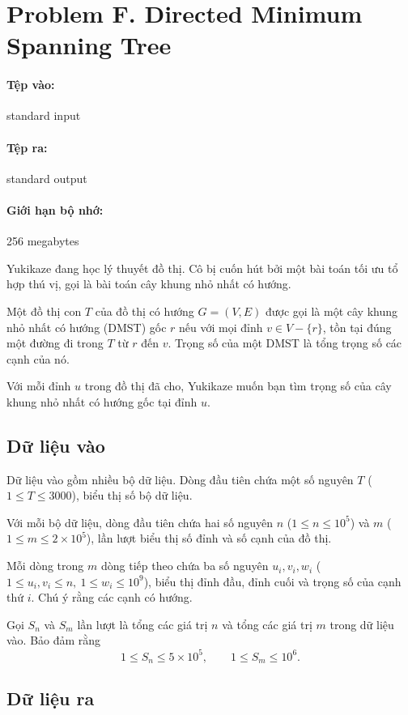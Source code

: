 \documentclass[11pt]{article}
\begin{document}
\section{Problem F. Directed Minimum Spanning Tree}

\paragraph{Tệp vào:} standard input
\paragraph{Tệp ra:} standard output
\paragraph{Giới hạn bộ nhớ:} 256 megabytes

Yukikaze đang học lý thuyết đồ thị. Cô bị cuốn hút bởi một bài toán tối ưu
tổ hợp thú vị, gọi là bài toán cây khung nhỏ nhất có hướng.

Một đồ thị con \(T\) của đồ thị có hướng \(G=(V,E)\) được gọi là một cây
khung nhỏ nhất có hướng (DMST) gốc \(r\) nếu với mọi đỉnh \(v\in V-\{r\}\),
tồn tại đúng một đường đi trong \(T\) từ \(r\) đến \(v\). Trọng số của một
DMST là tổng trọng số các cạnh của nó.

Với mỗi đỉnh \(u\) trong đồ thị đã cho, Yukikaze muốn bạn tìm trọng số của
cây khung nhỏ nhất có hướng gốc tại đỉnh \(u\).

\subsection*{Dữ liệu vào}

Dữ liệu vào gồm nhiều bộ dữ liệu. Dòng đầu tiên chứa một số nguyên \(T\)
(\(1\le T\le 3000\)), biểu thị số bộ dữ liệu.

Với mỗi bộ dữ liệu, dòng đầu tiên chứa hai số nguyên \(n\)
(\(1\le n\le 10^5\)) và \(m\) (\(1\le m\le 2\times 10^5\)), lần lượt biểu thị
số đỉnh và số cạnh của đồ thị.

Mỗi dòng trong \(m\) dòng tiếp theo chứa ba số nguyên \(u_i,v_i,w_i\)
(\(1\le u_i,v_i\le n,\ 1\le w_i\le 10^9\)), biểu thị đỉnh đầu, đỉnh cuối và
trọng số của cạnh thứ \(i\). Chú ý rằng các cạnh có hướng.

Gọi \(S_n\) và \(S_m\) lần lượt là tổng các giá trị \(n\) và tổng các giá trị
\(m\) trong dữ liệu vào. Bảo đảm rằng
\[
  1\le S_n\le 5\times 10^5,\qquad
  1\le S_m\le 10^6.
\]

\subsection*{Dữ liệu ra}
\end{document}
